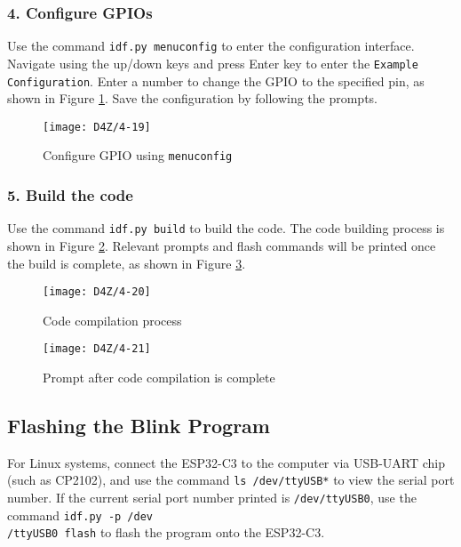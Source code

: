 \documentclass[a4paper,12pt]{book}
\begin{document}
\subsubsection{4. Configure GPIOs}
Use the command \verb|idf.py menuconfig| to enter the configuration interface. Navigate using the up/down keys and press Enter key to enter the \verb|Example Configuration|. Enter a number to change the GPIO to the specified pin, as shown in Figure 
\ref{Configure GPIO using menuconfig}. Save the configuration by following the prompts.

\begin{figure}[h!]
    \Centering
    \texttt{[image: D4Z/4-19]}
    \caption{Configure GPIO using \texttt{menuconfig}}
    \label{Configure GPIO using menuconfig}
\end{figure}

\subsubsection{5. Build the code}
Use the command \verb|idf.py build| to build the code. The code building process is shown in Figure \ref{Code compilation process}. Relevant prompts and flash commands will be printed once the build is complete, as shown in Figure \ref{Prompt after code compilation is complete}.

\begin{figure}[h!]
    \Centering
    \texttt{[image: D4Z/4-20]}
    \caption{Code compilation process}
    \label{Code compilation process}
\end{figure}

\begin{figure}[h!]
    \Centering
    \texttt{[image: D4Z/4-21]}
    \caption{Prompt after code compilation is complete}
    \label{Prompt after code compilation is complete}
\end{figure}

\subsection{Flashing the Blink Program}
For Linux systems, connect the ESP32-C3 to the computer via USB-UART chip (such as CP2102), and use the command \verb|ls /dev/ttyUSB*| to view the serial port number. If the current serial port number printed is \verb|/dev/ttyUSB0|, use the command \verb|idf.py -p /dev|\\ \verb|/ttyUSB0 flash| to flash the program onto the ESP32-C3.
\end{document}
